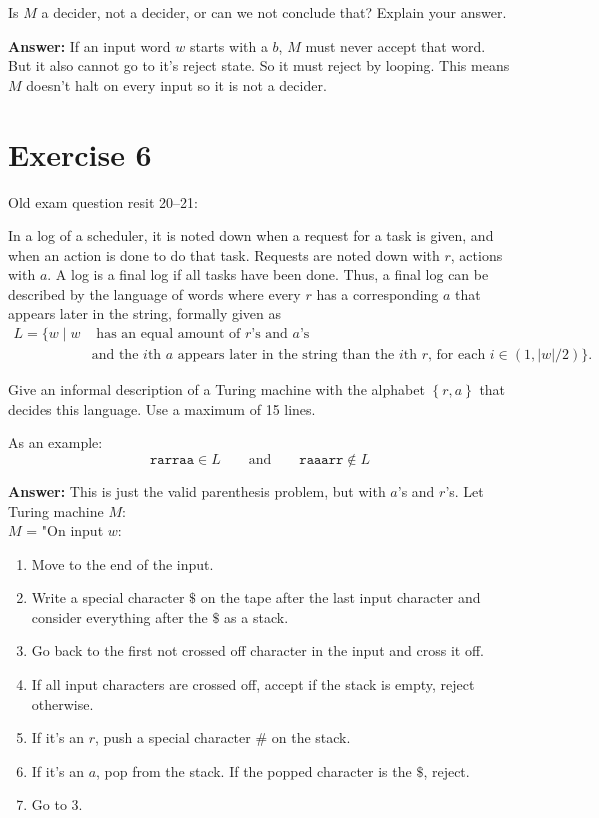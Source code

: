 \documentclass[a4paper,11pt]{article}
\newcommand{\set}[1]{\left\{ #1 \right\}}
\begin{document}
	Is $M$ a decider, not a decider, or can we not conclude that? Explain your answer.

	\textbf{Answer: }If an input word $w$ starts with a $b$, $M$ must never accept that word. But it also cannot go to it's reject state. So it must reject by looping. This means $M$ doesn't halt on every input so it is not a decider.

	\section{Exercise 6}
	Old exam question resit 20--21:

	In a log of a scheduler, it is noted down when a request for a task is given, and when an action is done to do that task. Requests are noted down with $r$, actions with $a$. A log is a final log if all tasks have been done. Thus, a final log can be described by the language of words where every $r$ has a corresponding $a$ that appears later in the string, formally given as
	\begin{align*}
		L = \{w \mid w &\text{ has an equal amount of $r$'s and $a$'s}\\
		&\text{and the $i$th $a$ appears later in the string than the $i$th $r$, for each } i \in (1, |w|/2)\}.
	\end{align*}


	Give an informal description of a Turing machine with the alphabet $\set{r,a}$ that decides this language. Use a maximum of 15 lines.

	As an example:
	\[
	\texttt{rarraa} \in L \qquad \text{and} \qquad \texttt{raaarr} \notin L
	\]

	\textbf{Answer: }This is just the valid parenthesis problem, but with $a$'s and $r$'s. Let Turing machine $M$:\\
	$M$ = "On input $w$:
	\begin{enumerate}
		\item Move to the end of the input.
		\item Write a special character $\$$ on the tape after the last input character and consider everything after the $\$$ as a stack.
		\item Go back to the first not crossed off character in the input and cross it off.
		\item If all input characters are crossed off, accept if the stack is empty, reject otherwise.
		\item If it's an $r$, push a special character $\#$ on the stack.
		\item If it's an $a$, pop from the stack. If the popped character is the $\$$, reject.
		\item Go to 3.
	\end{enumerate}
\end{document}
